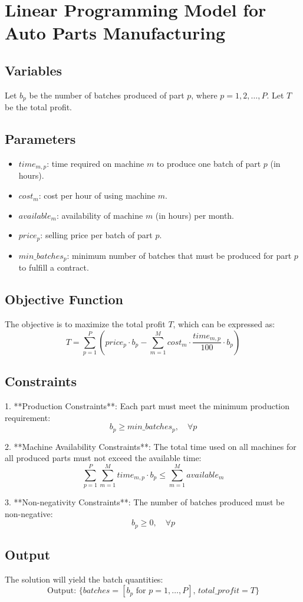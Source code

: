 \documentclass{article}
\begin{document}
\section*{Linear Programming Model for Auto Parts Manufacturing}

\subsection*{Variables}
Let \(b_p\) be the number of batches produced of part \(p\), where \(p = 1, 2, \ldots, P\).  
Let \(T\) be the total profit.

\subsection*{Parameters}
\begin{itemize}
    \item \(time_{m,p}\): time required on machine \(m\) to produce one batch of part \(p\) (in hours).
    \item \(cost_{m}\): cost per hour of using machine \(m\).
    \item \(available_{m}\): availability of machine \(m\) (in hours) per month.
    \item \(price_{p}\): selling price per batch of part \(p\).
    \item \(min\_batches_{p}\): minimum number of batches that must be produced for part \(p\) to fulfill a contract.
\end{itemize}  

\subsection*{Objective Function}
The objective is to maximize the total profit \(T\), which can be expressed as:
\[
T = \sum_{p=1}^{P} (price_{p} \cdot b_{p} - \sum_{m=1}^{M} cost_{m} \cdot \frac{time_{m,p}}{100} \cdot b_{p})
\]

\subsection*{Constraints}
1. **Production Constraints**: Each part must meet the minimum production requirement:
   \[
   b_{p} \geq min\_batches_{p}, \quad \forall p
   \]

2. **Machine Availability Constraints**: The total time used on all machines for all produced parts must not exceed the available time:
   \[
   \sum_{p=1}^{P} \sum_{m=1}^{M} time_{m,p} \cdot b_{p} \leq \sum_{m=1}^{M} available_{m}
   \]

3. **Non-negativity Constraints**: The number of batches produced must be non-negative:
   \[
   b_{p} \geq 0, \quad \forall p
   \]

\subsection*{Output}
The solution will yield the batch quantities:
\[
\text{Output: } \{batches = [b_{p} \text{ for } p = 1, \ldots, P], \, total\_profit = T \}
\]
\end{document}
